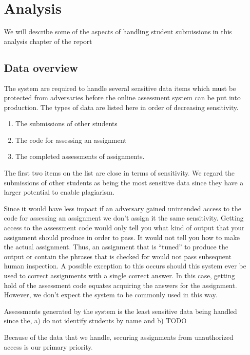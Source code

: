 \chapter{Analysis}
We will describe some of the aspects of handling student submissions
in this analysis chapter of the report

\section{Data overview}

The system are required to handle  several sensitive data items which must be
protected from adversaries before the online assessment system can be
put into production. The types of data are listed here in order of
decreasing sensitivity.

\begin{enumerate}
  \item The submissions of other students
  \item The code for assessing an assignment
  \item The completed assessments of assignments.
\end{enumerate}

The first two items on the list are close in terms of
sensitivity. We regard the submissions of other students as being the
most sensitive data since they have a larger potential to enable
plagiarism.

Since it would have less impact if an adversary gained unintended access
to the code for assessing an assignment we don't assign it the same
sensitivity. Getting access to the assessment code would only tell you
what kind of output that your assignment should produce in order to
pass. It would not tell you how to make the actual assignment. Thus,
an assignment that is "`tuned"' to produce the output or contain the
phrases that is checked for would not pass subsequent human
inspection. A possible exception to this occurs should this system
ever be used to correct assignments with a single correct answer. In
this case, getting hold of the assessment code equates acquiring the
answers for the assignment. However, we don't expect the system to be
commonly used in this way.

Assessments generated by the system is the least sensitive data being
handled since the, a) do not identify students by name  and b)
TODO

Because of the data that we handle, securing assignments from
unauthorized access is our primary priority.

